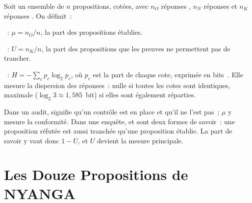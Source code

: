 \begin{boxdef}
Soit un ensemble de $n$ propositions, cotées, avec $n_{O}$ réponses \OUI{},
$n_{N}$ réponses \NON{} et $n_{K}$ réponses \NEK{}. On définit~:

\smallskip
\textbf{}~: $\mu = n_{O}/n$, la part des
propositions établies.

\smallskip
\textbf{}~: $U = n_{K}/n$, la part des
propositions que les preuves ne permettent pas de trancher.

\smallskip
\textbf{}~: $H = -\sum_{c} p_{c} \log_{2} p_{c}$, où
$p_{c}$ est la part de chaque cote, exprimée en bits~\cite{shannon1948}.
Elle mesure la dispersion des réponses~: nulle si toutes les cotes sont
identiques, maximale ($\log_{2} 3 \approx 1{,}585$~bit) si elles sont
également réparties.
\end{boxdef}

Dans un audit, \OUI{} signifie qu'un contrôle est en place et \NON{} qu'il
ne l'est pas~; $\mu$ y mesure la conformité. Dans une enquête, \OUI{} et
\NON{} sont deux formes de savoir~: une proposition réfutée est aussi
tranchée qu'une proposition établie. La part de savoir y vaut donc $1 - U$,
et $U$ devient la mesure principale.

\section{Les Douze Propositions de NYANGA}
\label{sec:c16-nyanga}

